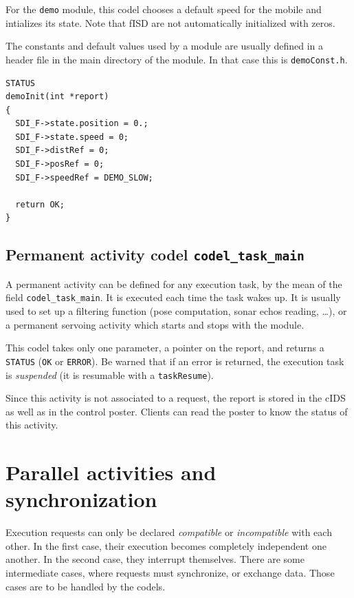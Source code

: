 For the \texttt{demo} module,  this codel chooses  a  default speed for  the
mobile  and intializes its state.   Note  that fISD are not automatically
initialized with zeros.

The constants and default values used by a  module are usually defined in
a header file in the main directory  of the module. In  that case this is
\texttt{demoConst.h}.

\begin{center}\begin{cartouche}\small\begin{verbatim}
STATUS
demoInit(int *report)
{
  SDI_F->state.position = 0.;
  SDI_F->state.speed = 0;
  SDI_F->distRef = 0;
  SDI_F->posRef = 0;
  SDI_F->speedRef = DEMO_SLOW;

  return OK;
}
\end{verbatim}\end{cartouche}\end{center}


\subsection{Permanent activity codel \texttt{codel\_task\_main}}

A permanent activity can  be defined for  any execution task, by the mean
of the  field  \texttt{codel\_task\_main}.  It is executed  each  
time the task  wakes up. 
It is usually used to set up a  filtering function (pose computation,
sonar echos  reading, \ldots), or   a permanent  servoing activity  which
starts and stops with the module.

This codel takes only one parameter, a pointer on the report, and returns
a \texttt{STATUS} (\texttt{OK} or \texttt{ERROR}).  Be warned that  if an error is
returned, the execution task  is \emph{suspended} (it  is resumable with a
\texttt{taskResume}).

Since this activity is not associated to a  request, the report is stored
in the cIDS as well as in the control poster. Clients can read the poster
to know the status of this activity.


\section{Parallel activities and synchronization}

Execution   requests can  only  be  declared  \emph{compatible} or  {\em
incompatible} with each other. In the first case, their execution becomes
completely  independent one another.  In  the second case, they interrupt
themselves.  There are  some   intermediate  cases, where  requests  must
synchronize, or exchange  data.   Those cases are  to  be handled  by the
codels.

